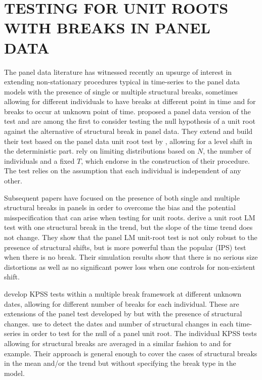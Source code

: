 \documentclass[a4paper,fleqn]{article} %
\begin{document}
\section{TESTING FOR UNIT ROOTS WITH BREAKS IN PANEL DATA}

The panel data literature has witnessed recently an upsurge of interest in extending non-stationary procedures typical in time-series to the panel data models with the presence of single or multiple structural breaks, sometimes allowing for different individuals to have breaks at different point in time and for breaks to occur at unknown point of time. \citet{Carrion:2002} proposed a panel data version of the \citet{Perron:1989} test and are among the first to consider testing the null hypothesis of a unit root against the alternative of structural break in panel data. They extend and build their test based on the panel data unit root test by \citet{Harris:1999},  allowing for a level shift in the deterministic part. \citet{Harris:1999} rely on limiting distributions based on $N$, the number of individuals and a fixed $T$, which \citet{Carrion:2002} endorse in the construction of their procedure. The test relies on the assumption that each individual is independent of any other.

Subsequent papers have focused on the presence of both single and multiple structural breaks in panels in order to overcome the bias and the potential misspecification that can arise when testing for unit roots. \citet{Im:2005} derive a unit root LM test with one structural break in the trend, but the slope of the time trend does not change. They show that the panel LM unit-root test is not only robust to the presence of structural shifts, but is more powerful than the popular \citet{Im:2003} (IPS) test when there is no break. Their simulation results show that there is no serious size distortions as well as no significant power loss when one controls for non-existent shift.

\citet{Carrion:2005} develop KPSS tests within a multiple break framework at different unknown dates, allowing for different number of breaks for each individual. These are extensions of the panel test developed by \citet{Hadri:2000} but with the presence of structural changes. \citet{Carrion:2005} use \citet{Bai:1998} to detect the dates and number of structural changes in each time-series in order to test for the null of a panel unit root. The individual KPSS tests allowing for structural breaks are averaged in a similar fashion to \citet{Im:2003} and \citet{ChanManciniPauwels:2009} for example. Their approach is general enough to cover the cases of structural breaks in the mean and/or the trend but without specifying the break type in the model.
\end{document}
